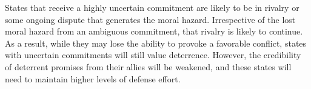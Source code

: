 \documentclass[12pt]{article}
\begin{document}
States that receive a highly uncertain commitment are likely to be in rivalry or some ongoing dispute that generates the moral hazard. Irrespective of the lost moral hazard from an ambiguous commitment, that rivalry is likely to continue. As a result, while they may lose the ability to provoke a favorable conflict, states with uncertain commitments will still value deterrence. However, the credibility of deterrent promises from their allies will be weakened, and these states will need to maintain higher levels of defense effort.












  
% 
\end{document}
